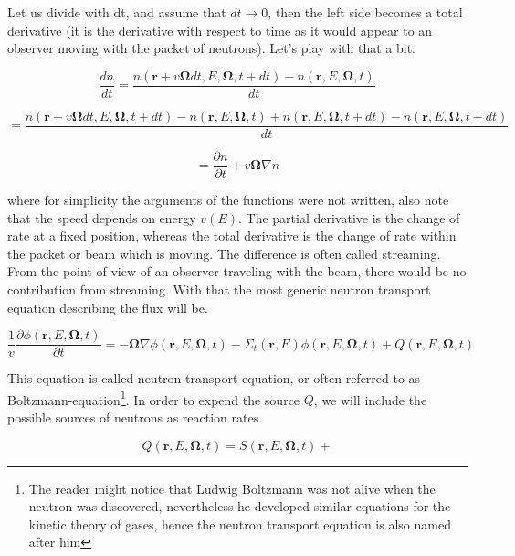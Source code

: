 Let us divide with dt, and assume that $dt\rightarrow 0$, then the left side becomes a total derivative (it is the derivative with respect to time as it would appear to an observer moving with the packet of neutrons). Let's play with that a bit.

\begin{equation}
\frac{dn}{dt}=\frac{n(\mathbf{r}+v\mathbf{\Omega}dt,E,\mathbf{\Omega},t+dt)-n(\mathbf{r},E,\mathbf{\Omega},t)}{dt}
\end{equation}

\begin{equation*}
=\frac{n(\mathbf{r}+v\mathbf{\Omega}dt,E,\mathbf{\Omega},t+dt)-n(\mathbf{r},E,\mathbf{\Omega},t)+n(\mathbf{r},E,\mathbf{\Omega},t+dt)-n(\mathbf{r},E,\mathbf{\Omega},t+dt)}{dt}
\end{equation*}

\begin{equation*}
=\frac{\partial n}{\partial t}+v\mathbf{\Omega}\nabla n
\end{equation*}

\noindent where for simplicity the arguments of the functions were not written, also note that the speed depends on energy $v(E)$. The partial derivative is the change of rate at a fixed position, whereas the total derivative is the change of rate within the packet or beam which is moving. The difference is often called streaming. From the point of view of an observer traveling with the beam, there would be no contribution from streaming. With that the most generic neutron transport equation describing the flux will be.

\begin{equation}
\frac{1}{v}\frac{\partial\phi(\mathbf{r},E,\mathbf{\Omega},t)}{\partial t}=-\mathbf{\Omega}\nabla\phi(\mathbf{r},E,\mathbf{\Omega},t)-\Sigma_t(\mathbf{r},E)\phi(\mathbf{r},E,\mathbf{\Omega},t)+Q(\mathbf{r},E,\mathbf{\Omega},t)
\end{equation}

This equation is called neutron transport equation, or often referred to as Boltzmann-equation\footnote{The reader might notice that Ludwig Boltzmann was not alive when the neutron was discovered, nevertheless he developed similar equations for the kinetic theory of gases, hence the neutron transport equation is also named after him}. In order to expend the source $Q$, we will include the possible sources of neutrons as reaction rates

\begin{equation}
Q(\mathbf{r},E,\mathbf{\Omega},t)=S(\mathbf{r},E,\mathbf{\Omega},t)+
\end{equation}

